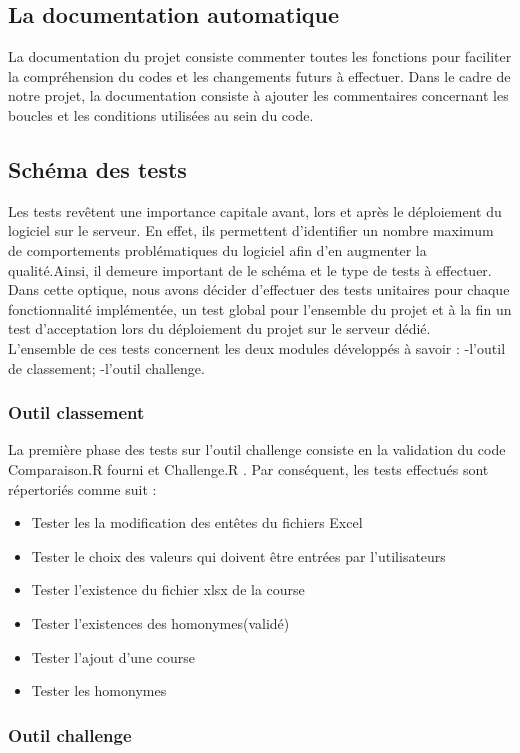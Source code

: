 \subsection {La documentation automatique}
La documentation du projet consiste commenter toutes les fonctions pour faciliter la compréhension du codes et les changements futurs à effectuer.
Dans le cadre de notre projet,  la documentation  consiste à ajouter les commentaires concernant les boucles et les conditions utilisées au sein du code.


\subsection {Schéma des tests}
Les tests revêtent une importance capitale avant, lors et après le déploiement du logiciel sur le serveur. En effet, ils permettent d'identifier un nombre maximum de comportements problématiques du logiciel afin d'en augmenter la qualité.Ainsi, il demeure important de  le schéma et le type de tests à effectuer. \\
Dans cette optique, nous avons décider d'effectuer des tests unitaires pour chaque fonctionnalité implémentée, un test global pour l'ensemble du projet et à la fin un test d'acceptation lors du déploiement du projet sur le serveur dédié.\\
L'ensemble de ces tests concernent les deux modules développés à savoir :
-l'outil de classement; 
-l'outil challenge.

\subsubsection{Outil classement}
La première phase  des tests sur l'outil challenge consiste en la validation du code  Comparaison.R fourni et Challenge.R . Par conséquent, les tests effectués sont répertoriés comme suit :
\begin{itemize}
\item Tester les la modification des entêtes du fichiers Excel
\item Tester le choix des valeurs qui doivent être entrées par l'utilisateurs
\item Tester l'existence du fichier xlsx de la course
\item Tester l'existences des homonymes(validé)
\item Tester l'ajout d'une course
\item Tester les homonymes
\end{itemize}
\subsubsection{Outil challenge}

